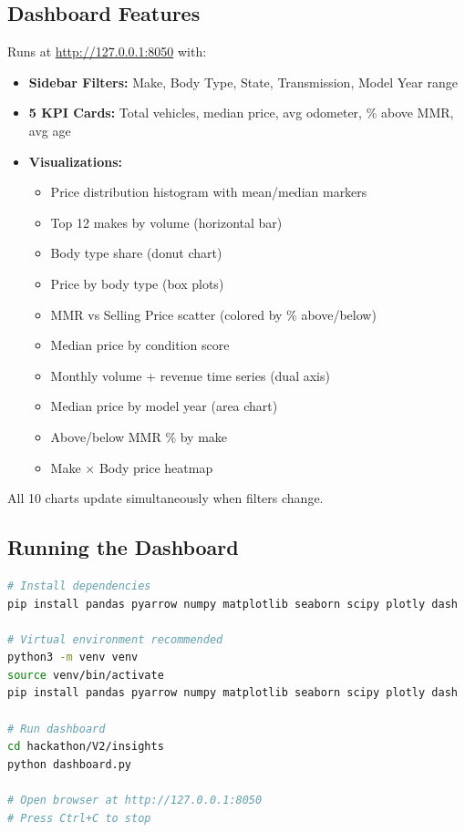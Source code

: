\documentclass[12pt,a4paper]{article}
\begin{document}
\subsection{Dashboard Features}

Runs at \url{http://127.0.0.1:8050} with:

\begin{itemize}
    \item \textbf{Sidebar Filters:} Make, Body Type, State, Transmission, Model Year range
    \item \textbf{5 KPI Cards:} Total vehicles, median price, avg odometer, \% above MMR, avg age
    \item \textbf{Visualizations:}
    \begin{itemize}
        \item Price distribution histogram with mean/median markers
        \item Top 12 makes by volume (horizontal bar)
        \item Body type share (donut chart)
        \item Price by body type (box plots)
        \item MMR vs Selling Price scatter (colored by \% above/below)
        \item Median price by condition score
        \item Monthly volume + revenue time series (dual axis)
        \item Median price by model year (area chart)
        \item Above/below MMR \% by make
        \item Make $\times$ Body price heatmap
    \end{itemize}
\end{itemize}

All 10 charts update simultaneously when filters change.

\subsection{Running the Dashboard}

\begin{lstlisting}[language=bash]
# Install dependencies
pip install pandas pyarrow numpy matplotlib seaborn scipy plotly dash

# Virtual environment recommended
python3 -m venv venv
source venv/bin/activate
pip install pandas pyarrow numpy matplotlib seaborn scipy plotly dash

# Run dashboard
cd hackathon/V2/insights
python dashboard.py

# Open browser at http://127.0.0.1:8050
# Press Ctrl+C to stop
\end{lstlisting}
\end{document}
